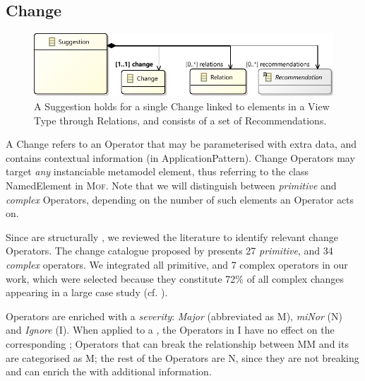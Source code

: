\subsection{Change}
\label{sec:Suggestion:Change}

\begin{figure}[t]
    \centering
    \includegraphics[width=\columnwidth]{images/Suggestion.pdf}
    \caption{A \textsf{Suggestion} holds for a single \textsf{Change} linked to 
		elements in a View Type through \textsf{Relation}s, and consists of a set of \textsf{Recommendation}s.}
    \label{fig:Suggestion}
\end{figure}

A \textsf{Change} refers to an \textsf{Operator} that may be parameterised with 
extra data, and contains contextual information (in \textsf{ApplicationPattern}). 
Change \textsf{Operator}s may target \emph{any} instanciable metamodel element, 
thus referring to the class \textsf{NamedElement} in \textsc{Mof}. Note that we 
will distinguish between \emph{primitive} and \emph{complex} \textsf{Operator}s,
depending on the number of such \metamodel elements an \textsf{Operator} acts on.

Since \viewtypes are structurally \metamodels, we reviewed the literature to
identify relevant change \textsf{Operator}s. The change catalogue proposed by 
\cite{herrmannsdoerfer_extensive_2011} presents 27 \emph{primitive}, and 34
\emph{complex} operators. We integrated all primitive, and 7 complex operators
in our work, which were selected because they constitute 72\% of all complex
changes appearing in a large case study (cf. \cite{khelladi_detecting_2015}). 

\textsf{Operator}s are enriched with a \emph{severity}: \emph{Major}
(abbreviated as \textsf{M}), \emph{miNor} (\textsf{N}) and \emph{Ignore} 
(\textsf{I}). 
When applied to a \metamodel, the \textsf{Operator}s in \textsf{I} have no effect
on the corresponding \viewtypes; \textsf{Operator}s that can break the relationship
between \textsf{MM }and its \viewtypes are categorised as \textsf{M}; the rest of the
\textsf{Operator}s are \textsf{N}, since they are not breaking and can enrich 
the \viewtypes with additional information.

